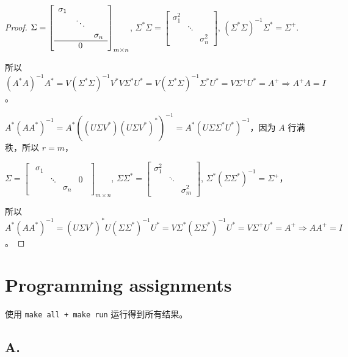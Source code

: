 \documentclass[lang=cn,a4paper,newtx,bibend=bibtex]{elegantpaper}
\begin{document}
\begin{proof}
  $\Sigma = \begin{bmatrix}
    \begin{array}{ccc}
      \sigma_1 & & \\
      & \ddots & \\
      & & \sigma_n \\
      \hline
      & 0 &
    \end{array}
  \end{bmatrix}_{m\times n}
  $, $\Sigma^*\Sigma = \begin{bmatrix}
    \sigma_1^2 & & \\
    & \ddots & \\
     & & \sigma_n^2
  \end{bmatrix}$, 
  $(\Sigma^*\Sigma)^{-1}\Sigma^* = \Sigma^+$.

  所以 
  $(A^*A)^{-1}A^* = V(\Sigma^*\Sigma)^{-1}V^*V\Sigma^*U^* = V(\Sigma^*\Sigma)^{-1}\Sigma^*U^* = V\Sigma^+U^* = A^+ \Rightarrow A^+A = I$。


  $A^*(AA^*)^{-1} = A^*((U\Sigma V^*)(U\Sigma V^*)^*)^{-1} = A^*(U\Sigma \Sigma^* U^*)^{-1}$，因为 $A$ 行满秩，所以 $r = m$，

  $\Sigma = \begin{bmatrix} 
    \begin{array}{ccc|c}
      \sigma_1 & & & \\
       & \ddots & & 0\\
       & & \sigma_n & 
    \end{array}
  \end{bmatrix}_{m\times n}$,
  $\Sigma\Sigma^* = \begin{bmatrix}
    \sigma_1^2 & & \\
    & \ddots & \\
     & & \sigma_m^2
  \end{bmatrix}$, $\Sigma^*(\Sigma\Sigma^*)^{-1} = \Sigma^+$，

  所以 $A^*(AA^*)^{-1} = (U\Sigma V^*)^*U(\Sigma \Sigma^*)^{-1}U^* = V\Sigma^*(\Sigma\Sigma^*)^{-1}U^* = V\Sigma^+U^* = A^+ \Rightarrow AA^+ = I$。
\end{proof}

\section{Programming assignments}

使用 \lstinline{make all + make run} 运行得到所有结果。

\subsection{A.}
\end{document}
